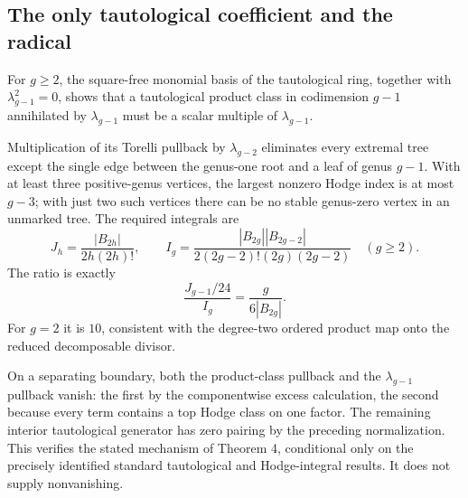 \documentclass[10pt]{article}
\begin{document}
\subsection*{The only tautological coefficient and the radical}
For \(g\ge2\), the square-free monomial basis of the tautological ring, together with \(\lambda_{g-1}^2=0\), shows that a tautological product class in codimension \(g-1\) annihilated by \(\lambda_{g-1}\) must be a scalar multiple of \(\lambda_{g-1}\).\par
Multiplication of its Torelli pullback by \(\lambda_{g-2}\) eliminates every extremal tree except the single edge between the genus-one root and a leaf of genus \(g-1\). With at least three positive-genus vertices, the largest nonzero Hodge index is at most \(g-3\); with just two such vertices there can be no stable genus-zero vertex in an unmarked tree. The required integrals are \[J_h=\frac{|B_{2h}|}{2h(2h)!},\qquad
 I_g=\frac{|B_{2g}||B_{2g-2}|}
 {2(2g-2)!(2g)(2g-2)}\quad(g\ge2).\] The ratio is exactly \[\frac{J_{g-1}/24}{I_g}
                       =\frac{g}{6|B_{2g}|}.\] For \(g=2\) it is \(10\), consistent with the degree-two ordered product map onto the reduced decomposable divisor.\par
On a separating boundary, both the product-class pullback and the \(\lambda_{g-1}\) pullback vanish: the first by the componentwise excess calculation, the second because every term contains a top Hodge class on one factor. The remaining interior tautological generator has zero pairing by the preceding normalization. This verifies the stated mechanism of Theorem 4, conditional only on the precisely identified standard tautological and Hodge-integral results. It does not supply nonvanishing.\par
\end{document}
